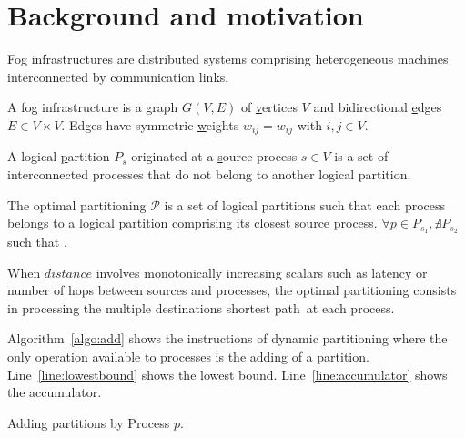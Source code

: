 
\section{Background and motivation}
\label{sec:background}

Fog infrastructures are distributed systems comprising heterogeneous
machines interconnected by communication links.

\begin{definition}
  A fog infrastructure is a \underline{g}raph $G(V, E)$ of
  \underline{v}ertices $V$ and bidirectional \underline{e}dges $E \in
  V \times V$. Edges have symmetric \underline{w}eights $w_{ij} =
  w_{ij}$ with $i, j \in V$.
\end{definition}

\begin{definition}
  A logical \underline{p}artition $P_s$ originated at a
  \underline{s}ource process $s \in V$ is a set of interconnected
  processes that do not belong to another logical partition.
\end{definition}

\begin{definition}
  The optimal partitioning $\mathcal{P}$ is a set of logical
  partitions such that each process belongs to a logical partition
  comprising its closest source process. $\forall p \in P_{s_1},
  \nexists P_{s_2}$ such that .
\end{definition}

When $distance$ involves monotonically increasing scalars such as
latency or number of hops between sources and processes, the optimal
partitioning consists in processing the multiple destinations shortest
path~\REF at each process. 


Algorithm~\ref{algo:add} shows the instructions of dynamic
partitioning where the only operation available to processes is the
adding of a partition.  Line~\ref{line:lowestbound} shows the lowest
bound. Line~\ref{line:accumulator} shows the accumulator.

\begin{algorithm}
  
  \caption{\label{algo:add}Adding partitions by Process $p$.}
\end{algorithm}


\begin{figure*}
  \begin{center}
    \hspace{5pt}
  \end{center}
\end{figure*}


